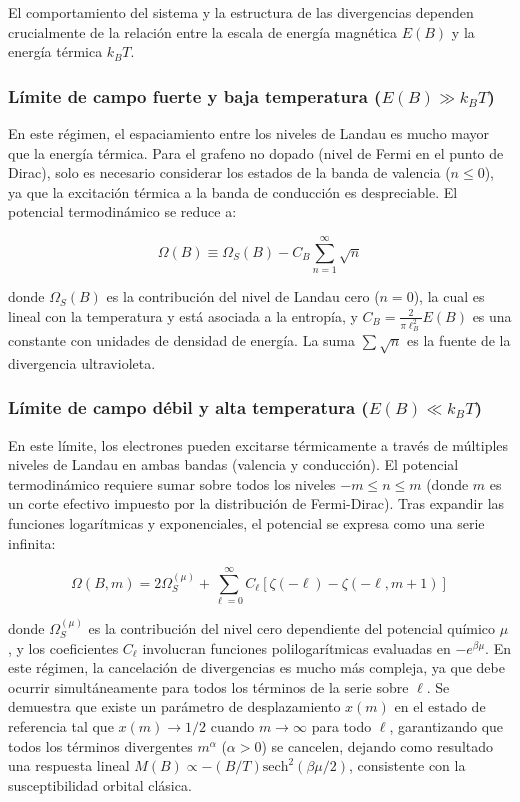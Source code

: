 El comportamiento del sistema y la estructura de las divergencias dependen crucialmente de la relación entre la escala de energía magnética $E(B)$ y la energía térmica $k_B T$.

\subsubsection*{Límite de campo fuerte y baja temperatura ($E(B) \gg k_B T$)}

En este régimen, el espaciamiento entre los niveles de Landau es mucho mayor que la energía térmica. Para el grafeno no dopado (nivel de Fermi en el punto de Dirac), solo es necesario considerar los estados de la banda de valencia ($n \le 0$), ya que la excitación térmica a la banda de conducción es despreciable. El potencial termodinámico se reduce a:

$$ \Omega(B) \equiv \Omega_S(B) - C_B \sum_{n=1}^{\infty} \sqrt{n} $$

donde $\Omega_S(B)$ es la contribución del nivel de Landau cero ($n=0$), la cual es lineal con la temperatura y está asociada a la entropía, y $C_B = \frac{2}{\pi \ell_B^2} E(B)$ es una constante con unidades de densidad de energía. La suma $\sum \sqrt{n}$ es la fuente de la divergencia ultravioleta.

\subsubsection*{Límite de campo débil y alta temperatura ($E(B) \ll k_B T$)}

En este límite, los electrones pueden excitarse térmicamente a través de múltiples niveles de Landau en ambas bandas (valencia y conducción). El potencial termodinámico requiere sumar sobre todos los niveles $-m \le n \le m$ (donde $m$ es un corte efectivo impuesto por la distribución de Fermi-Dirac). Tras expandir las funciones logarítmicas y exponenciales, el potencial se expresa como una serie infinita:

$$ \Omega(B, m) = 2\Omega_S^{(\mu)} + \sum_{\ell=0}^{\infty} C_\ell \left[ \zeta(-\ell) - \zeta(-\ell, m+1) \right] $$

donde $\Omega_S^{(\mu)}$ es la contribución del nivel cero dependiente del potencial químico $\mu$, y los coeficientes $C_\ell$ involucran funciones polilogarítmicas evaluadas en $-e^{\beta\mu}$. En este régimen, la cancelación de divergencias es mucho más compleja, ya que debe ocurrir simultáneamente para todos los términos de la serie sobre $\ell$. Se demuestra que existe un parámetro de desplazamiento $x(m)$ en el estado de referencia tal que $x(m) \to 1/2$ cuando $m \to \infty$ para todo $\ell$, garantizando que todos los términos divergentes $m^\alpha$ ($\alpha > 0$) se cancelen, dejando como resultado una respuesta lineal $M(B) \propto -(B/T)\text{sech}^2(\beta\mu/2)$, consistente con la susceptibilidad orbital clásica.


